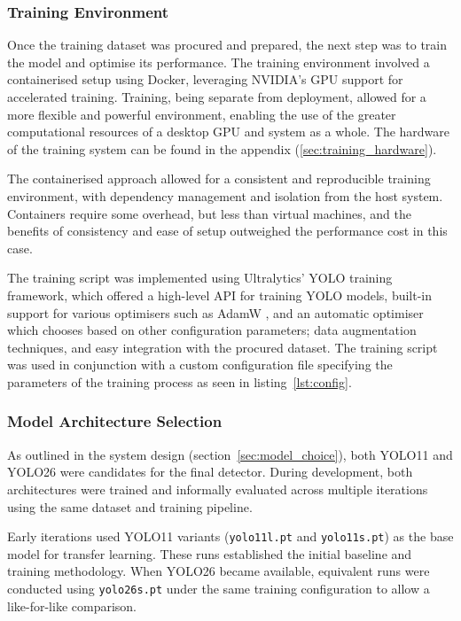 \subsubsection{Training Environment}

Once the training dataset was procured and prepared, the next step was to train
the model and optimise its performance. The training environment involved a
containerised setup using Docker, leveraging NVIDIA's GPU support for
accelerated training. Training, being separate from deployment, allowed for a
more flexible and powerful environment, enabling the use of the greater
computational resources of a desktop GPU and system as a whole. The hardware of
the training system can be found in the appendix (\ref{sec:training_hardware}).

The containerised approach allowed for a consistent and reproducible training
environment, with dependency management and isolation from the host system.
Containers require some overhead, but less than virtual machines, and the
benefits of consistency and ease of setup outweighed the performance cost in
this case.

The training script was implemented using Ultralytics' YOLO training framework,
which offered a high-level API for training YOLO models, built-in support for
various optimisers such as AdamW \citep{loschilov2017fixing}, and an automatic
optimiser which chooses based on other configuration parameters; data
augmentation techniques, and easy integration with the procured dataset. The
training script was used in conjunction with a custom configuration file
specifying the parameters of the training process as seen in
listing~\ref{lst:config}.

\subsubsection{Model Architecture Selection}
\label{sec:model_architecture_selection}

As outlined in the system design (section~\ref{sec:model_choice}), both YOLO11
and YOLO26 were candidates for the final detector. During development, both
architectures were trained and informally evaluated across multiple iterations
using the same dataset and training pipeline.

Early iterations used YOLO11 variants (\texttt{yolo11l.pt} and
\texttt{yolo11s.pt}) as the base model for transfer learning. These runs
established the initial baseline and training methodology. When YOLO26 became
available, equivalent runs were conducted using \texttt{yolo26s.pt} under the
same training configuration to allow a like-for-like comparison.

